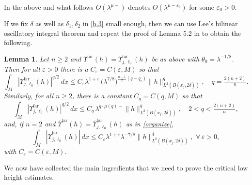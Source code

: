 \documentclass[10pt]{amsart}
\newtheorem{lemma}[theorem]{Lemma}
\newcommand{\la}{\lambda}
\newcommand{\e}{\varepsilon}
\newcommand{\1}{{\bf 1}}
\newcommand{\far}{\Upsilon^{\text{far}}}
\newcommand{\farbar}{\overline\Upsilon^{\text{far}}}
\begin{document}
In the above and what follows $O(\la^{\mu-})$ denotes $O(\la^{\mu-\e_0})$ for some $\e_0>0$.




If we  fix $\delta$ as well as 
$\delta_1,\delta_2$ in \eqref{b.3} small enough, then we can use Lee's \cite{LeeBilinear} bilinear oscillatory integral theorem 
and repeat the proof of Lemma 5.2 in \cite{HSp}
to obtain the following.


\begin{lemma}\label{lemma2}
Let $n\ge2$ and $\far(h)=\far_{j,\ell_0}(h)$ be as above with $\theta_0=\la^{-1/8}$.  Then for all $\e>0$ there is a $C_\e=C(\e,M)$ so that
\begin{equation}\label{b.68}
\int_M |\far_{j,\ell_0}(h)|^{q/2} \, dx \le C_\e \la^{1+\e} \, \bigl(\la^{7/8}\bigr)^{\frac{n-1}2(q-q_c)}
\|h\|^q_{L^2(B(x_j,2\delta))}, \quad q=\tfrac{2(n+2)}n.
\end{equation}
Similarly, for all $n\ge2$, there is a constant $C_q=C(q,M)$ so that
\begin{equation}\label{b.69}
\int_M |\far_{j,\ell_0}(h)|^{q/2} \, dx \le C_q \, \la^{q\cdot \mu(q)-}\|h\|^q_{L^2(B(x_j,2\delta))}, \quad 2<q<\tfrac{2(n+2)}n,
\end{equation}
and, if $n=2$ and $\farbar(h)=\farbar_{j,\ell_0}(h)$ as in \eqref{organize},
\begin{equation}\label{b.70}
\int_M |\farbar_{j,\ell_0}(h)| \, dx \le C_\e \la^{1+\e}\la^{-7/8}\|h\|^4_{L^2(B(x_j,2\delta))}, \, \, \forall \, \e>0,
\end{equation}
with $C_\e=C(\e,M)$.
\end{lemma}


We now have collected the main ingredients that we need to prove the critical low height estimates.
\end{document}
